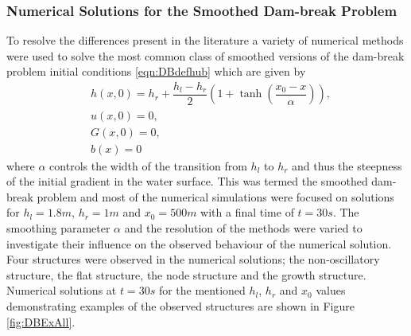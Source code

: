 \subsubsection{Numerical Solutions for the Smoothed Dam-break Problem}
To resolve the differences present in the literature a variety of numerical methods were used to solve the most common class of smoothed versions of the dam-break problem initial conditions \eqref{eqn:DBdefhub} which are given by
	\begin{align*}
	&h(x,0) = h_r + \dfrac{h_l - h_r}{2} \left(1 +  \tanh\left(\dfrac{x_0 - x}{\alpha}\right) \right), \\
	&u(x,0) = 0 , \\
	&G(x,0) = 0 , \\
	&b(x) = 0
	\end{align*}
where $\alpha$ controls the width of the transition from $h_l$ to $h_r$ and thus the steepness of the initial gradient in the water surface. This was termed the smoothed dam-break problem and most of the numerical simulations were focused on solutions for $h_l = 1.8m$, $h_r = 1m$ and $x_0 = 500m$ with a final time of $t=30s$. The smoothing parameter $\alpha$ and the resolution of the methods were varied to investigate their influence on the observed behaviour of the numerical solution. Four structures were observed in the numerical solutions; the non-oscillatory structure, the flat structure, the node structure and the growth structure. Numerical solutions at $t=30s$ for the mentioned $h_l$, $h_r$ and $x_0$ values demonstrating examples of the observed structures are shown in Figure \ref{fig:DBExAll}. 
